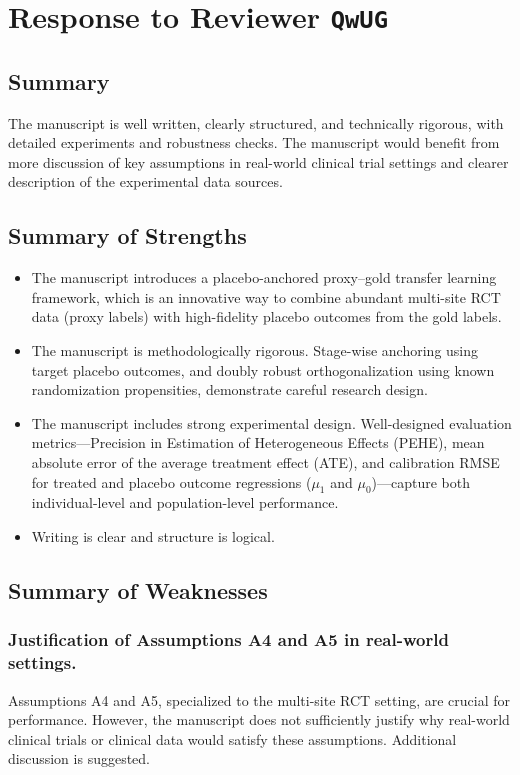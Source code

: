 \section{Response to Reviewer \texttt{QwUG}}

\subsection*{Summary}

The manuscript is well written, clearly structured, and technically rigorous, with detailed experiments and robustness checks. The manuscript would benefit from more discussion of key assumptions in real-world clinical trial settings and clearer description of the experimental data sources.


\subsection*{Summary of Strengths}

\begin{itemize}
    \item The manuscript introduces a placebo-anchored proxy--gold transfer learning framework, which is an innovative way to combine abundant multi-site RCT data (proxy labels) with high-fidelity placebo outcomes from the gold labels.
    \item The manuscript is methodologically rigorous. Stage-wise anchoring using target placebo outcomes, and doubly robust orthogonalization using known randomization propensities, demonstrate careful research design.
    \item The manuscript includes strong experimental design. Well-designed evaluation metrics—Precision in Estimation of Heterogeneous Effects (PEHE), mean absolute error of the average treatment effect (ATE), and calibration RMSE for treated and placebo outcome regressions ($\mu_1$ and $\mu_0$)—capture both individual-level and population-level performance.
    \item Writing is clear and structure is logical.
\end{itemize}

\subsection*{Summary of Weaknesses}

\subsubsection{Justification of Assumptions A4 and A5 in real-world settings.}  
Assumptions A4 and A5, specialized to the multi-site RCT setting, are crucial for performance. However, the manuscript does not sufficiently justify why real-world clinical trials or clinical data would satisfy these assumptions. Additional discussion is suggested.\\

